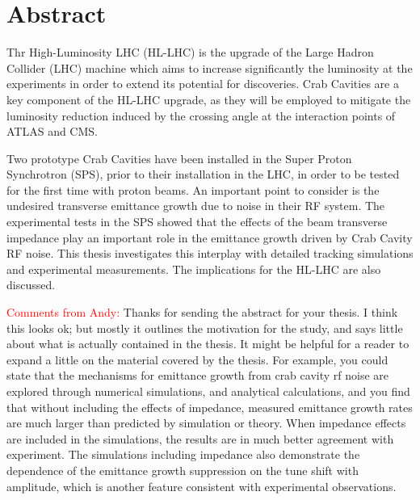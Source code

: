 \cleardoublepage
\chapter*{Abstract}


Thr High-Luminosity LHC (HL-LHC) is the upgrade of the Large Hadron Collider (LHC)  machine which aims to increase significantly the luminosity at the experiments in order to extend its potential for discoveries. Crab Cavities are a key component of the HL-LHC upgrade, as they will be employed to mitigate the luminosity reduction induced by the crossing angle at the interaction points of ATLAS and CMS. 


Two prototype Crab Cavities have been installed in the Super Proton Synchrotron (SPS), prior to their installation in the LHC, in order to be tested for the first time with proton beams. An important point to consider is the undesired transverse emittance growth due to noise in their RF system. The experimental tests in the SPS showed that the effects of the beam transverse impedance play an important role in the emittance growth driven by Crab Cavity RF noise. This thesis investigates this interplay with detailed tracking simulations and experimental measurements. The implications for the HL-LHC are also discussed.


\textcolor{red}{Comments from Andy:}
Thanks for sending the abstract for your thesis.  I think this looks ok; but mostly it outlines the motivation for the study, and says little about what is actually contained in the thesis.  It might be helpful for a reader to expand a little on the material covered by the thesis.  For example, you could state that the mechanisms for emittance growth from crab cavity rf noise are explored through numerical simulations, and analytical calculations, and you find that without including the effects of impedance, measured emittance growth rates are much larger than predicted by simulation or theory.  When impedance effects are included in the simulations, the results are in much better agreement with experiment.  The simulations including impedance also demonstrate the dependence of the emittance growth suppression on the tune shift with amplitude, which is another feature consistent with experimental observations.

 


